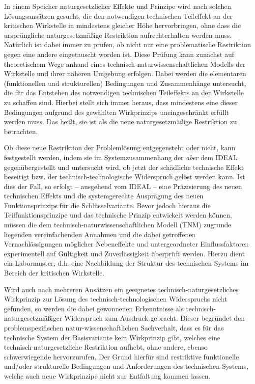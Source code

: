 \documentclass[12pt,a4paper]{article}
\begin{document}
In einem Speicher naturgesetzlicher Effekte und Prinzipe wird nach solchen
Lösungsansätzen gesucht, die den notwendigen technischen Teileffekt an der
kritischen Wirkstelle in mindestens gleicher Höhe hervorbringen, ohne dass die
ursprüngliche naturgesetzmäßige Restriktion aufrechterhalten werden
muss. Natürlich ist dabei immer zu prüfen, ob nicht nur eine problematische
Restriktion gegen eine andere eingetauscht worden ist. Diese Prüfung kann
zunächst auf theoretischem Wege anhand eines technisch-naturwissenschaftlichen
Modells der Wirkstelle und ihrer näheren Umgebung erfolgen. Dabei werden die
elementaren (funktionellen und strukturellen) Bedingungen und Zusammenhänge
untersucht, die für das Entstehen des notwendigen technischen Teileffekts an
der Wirkstelle zu schaffen sind. Hierbei stellt sich immer heraus, dass
mindestens eine dieser Bedingungen aufgrund des gewählten Wirkprinzips
uneingeschränkt erfüllt werden muss. Das heißt, sie ist als die neue
naturgesetzmäßige Restriktion zu betrachten.

Ob diese neue Restriktion der Problemlösung entgegensteht oder nicht, kann
festgestellt werden, indem sie im Systemzusammenhang der \emph{aber} dem IDEAL
gegenübergestellt und untersucht wird, ob jetzt der schädliche technische
Effekt beseitigt bzw. der technisch-technologische Widerspruch gelöst werden
kann. Ist dies der Fall, so erfolgt -- ausgehend vom IDEAL -- eine Präzisierung
des neuen technischen Effekts und die systemgerechte Ausprägung des neuen
Funktionsprinzips für die Schlüsselvariante. Bevor jedoch hieraus die
Teilfunktionsprinzipe und das technische Prinzip entwickelt werden können,
müssen die dem technisch-naturwissenschaftlichen Modell (TNM) zugrunde
liegenden vereinfachenden Annahmen und die dabei getroffenen
Vernachlässigungen möglicher Nebeneffekte und untergeordneter Einflussfaktoren
experimentell auf Gültigkeit und Zuverlässigkeit überprüft werden. Hierzu
dient ein Labormuster, d.h. eine Nachbildung der Struktur des technischen
Systems im Bereich der kritischen Wirkstelle.

Wird auch nach mehreren Ansätzen ein geeignetes technisch-naturgesetzliches
Wirkprinzip zur Lösung des technisch-technologischen Widerspruchs nicht
gefunden, so werden die dabei gewonnenen Erkenntnisse als
technisch-naturgesetzmäßiger Widerspruch zum Ausdruck gebracht. Dieser
begründet den problemspezifischen natur-wissenschaftlichen Sachverhalt, dass
es für das technische System der Basisvariante kein Wirkprinzip gibt, welches
eine technisch-naturgesetzliche Restriktion aufhebt, ohne andere, ebenso
schwerwiegende hervorzurufen. Der Grund hierfür sind restriktive funktionelle
und/oder strukturelle Bedingungen und Anforderungen des technischen Systems,
welche auch neue Wirkprinzipe nicht zur Entfaltung kommen lassen.
\end{document}
